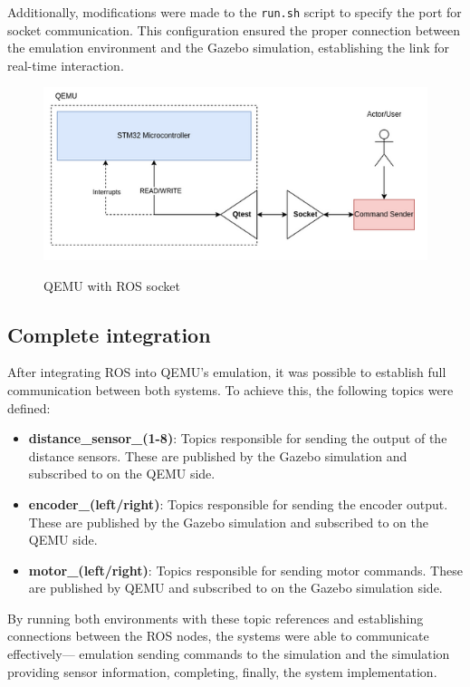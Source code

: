 \documentclass[../../monografia.tex]{subfiles}
\begin{document}
Additionally, modifications were made to the \texttt{run.sh} script to specify the port for socket communication. This configuration ensured the proper connection between the emulation environment and the Gazebo simulation, establishing the link for real-time interaction.
\begin{figure}[h!]
    \caption{QEMU with ROS socket}
    \centering
    \includegraphics[width=16cm]{src/images/ros_socket.png}
    \label{fig: QEMU with ROS socket}
\end{figure}

\subsection{Complete integration}

After integrating ROS into QEMU's emulation, it was possible to establish full communication between both systems. To achieve this, the following topics were defined:

\begin{itemize}
    \item \textbf{distance\_sensor\_(1-8)}: Topics responsible for sending the output of the distance sensors. These are published by the Gazebo simulation and subscribed to on the QEMU side.
    \item \textbf{encoder\_(left/right)}: Topics responsible for sending the encoder output. These are published by the Gazebo simulation and subscribed to on the QEMU side.
    \item \textbf{motor\_(left/right)}: Topics responsible for sending motor commands. These are published by QEMU and subscribed to on the Gazebo simulation side.
\end{itemize}

By running both environments with these topic references and establishing connections between the ROS nodes, the systems were able to communicate effectively— emulation sending commands to the simulation and the simulation providing sensor information, completing, finally, the system implementation.
\end{document}
